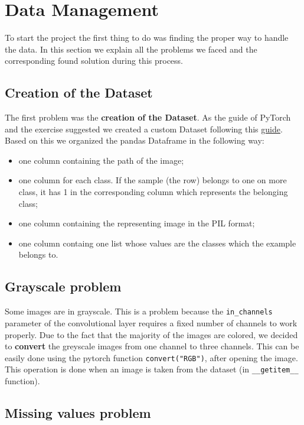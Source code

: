 \section{Data Management}
To start the project the first thing to do was finding the proper way to handle the data. In this section we explain all the problems we faced and the corresponding found solution during this process.

\subsection{Creation of the Dataset}
The first problem was the \textbf{creation of the Dataset}. As the guide of PyTorch and the exercise suggested we created a custom Dataset following this \href{https://github.com/utkuozbulak/pytorch-custom-dataset-examples}{guide}. Based on this we organized the pandas Dataframe in the following way:
\begin{itemize}
	\item one column containing the path of the image;
	\item one column for each class. If the sample (the row) belongs to one on more class, it has 1 in the corresponding column which represents the belonging class;
	\item one column containing the representing image in the PIL format;
	\item one column containg one list whose values are the classes which the example belongs to.
\end{itemize}

\subsection{Grayscale problem}

Some images are in grayscale. This is a problem because the \texttt{in\_channels} parameter of the convolutional layer requires a fixed number of channels to work properly. Due to the fact that the majority of the images are colored, we decided to \textbf{convert} the greyscale images from one channel to three channels. This can be easily done using the pytorch function \texttt{convert("RGB")}, after opening the image.
This operation is done when an image is taken from the dataset (in \texttt{\_\_getitem\_\_} function).

\subsection{Missing values problem}

